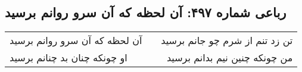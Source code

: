 \begin{center}
\section*{رباعی شماره ۴۹۷: آن لحظه که آن سرو روانم برسید}
\label{sec:0497}
\begin{longtable}{l p{0.5cm} r}
آن لحظه که آن سرو روانم برسید
&&
تن زد تنم از شرم چو جانم برسید
\\
او چونکه چنان بد چنانم برسید
&&
من چونکه چنین نیم بدانم برسید
\\
\end{longtable}
\end{center}
